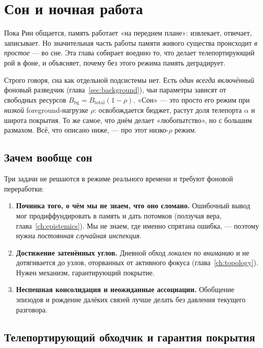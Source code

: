 \chapter{Сон и ночная работа}
\label{ch:sleep}

Пока Рин общается, память работает «на переднем плане»: извлекает, отвечает,
записывает. Но значительная часть работы памяти живого существа происходит
\emph{в простое} — во сне. Эта глава собирает воедино то, что делает
телепортирующий рой в фоне, и объясняет, почему без этого режима память
деградирует.

\begin{intuition}
Строго говоря, сна как отдельной подсистемы нет. Есть \emph{один всегда включённый}
фоновый разведчик (глава~\ref{sec:background}), чьи параметры зависят от свободных
ресурсов $B_{\text{bg}}=B_{\text{total}}(1-\rho)$. «Сон» — это просто его режим при
\emph{низкой} foreground-нагрузке $\rho$: освобождается бюджет, растут доля телепорта
$\alpha$ и широта покрытия. То же самое, что днём делает «любопытство», но с большим
размахом. Всё, что описано ниже, — про этот низко-$\rho$ режим.
\end{intuition}

\section{Зачем вообще сон}

Три задачи не решаются в режиме реального времени и требуют фоновой переработки:

\begin{enumerate}
\item \textbf{Починка того, о чём мы не знаем, что оно сломано.} Ошибочный вывод
мог продиффундировать в память и дать потомков (ползучая вера,
глава~\ref{ch:epistemics}). Мы не знаем, где именно спрятана ошибка, — поэтому
нужна \emph{постоянная случайная инспекция}.
\item \textbf{Достижение затенённых углов.} Дневной обход \emph{локален по вниманию}
и не дотягивается до узлов, оторванных от активного фокуса
(глава~\ref{ch:topology}). Нужен механизм, гарантирующий покрытие.
\item \textbf{Неспешная консолидация и неожиданные ассоциации.} Обобщение эпизодов и
рождение далёких связей лучше делать без давления текущего разговора.
\end{enumerate}

\section{Телепортирующий обходчик и гарантия покрытия}

